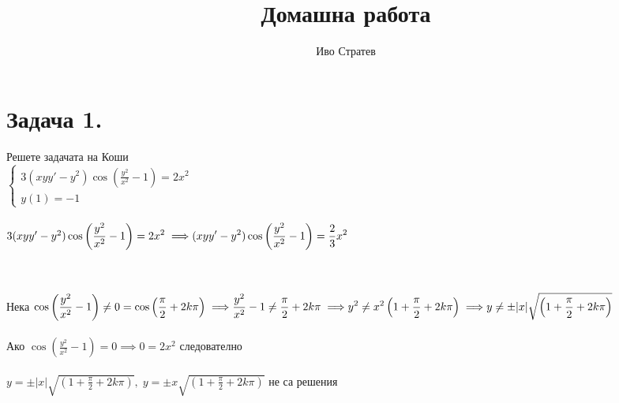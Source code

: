 \documentclass[12pt]{article}
\title{Домашна работа}
\author{Иво Стратев}
\begin{document}
\maketitle

\section*{Задача 1.}
Решете задачата на Коши \\

$\begin{cases}
    3(xyy' - y^2)\displaystyle\cos\left(\frac{y^2}{x^2} - 1\right) = 2x^2 \\
    y(1) = -1
\end{cases}$ \\\\

$
3(xyy' - y^2)\displaystyle\cos\left(\frac{y^2}{x^2} - 1\right) = 2x^2 \implies \\\\\\
(xyy' - y^2)\displaystyle\cos\left(\frac{y^2}{x^2} - 1\right) = \frac{2}{3}x^2
$ \\\\\

Нека $
\displaystyle\cos\left(\frac{y^2}{x^2} - 1\right) \neq 0 = \displaystyle\cos\left(\frac{\pi}{2} + 2k\pi\right) \implies \\\\\\
\frac{y^2}{x^2} - 1 \neq \frac{\pi}{2} + 2k\pi \implies \\\\\\
y^2 \neq x^2\left(1 + \frac{\pi}{2} + 2k\pi\right) \implies \\\\\\
y \neq \pm |x|\displaystyle\sqrt{\left(1 + \frac{\pi}{2} + 2k\pi\right)}
$ \\\\

Ако $\displaystyle\cos\left(\frac{y^2}{x^2} - 1\right) = 0 \implies 0 = 2x^2 $ следователно \\\\

$y = \pm |x|\displaystyle\sqrt{\left(1 + \frac{\pi}{2} + 2k\pi\right)}, \; y = \pm x\displaystyle\sqrt{\left(1 + \frac{\pi}{2} + 2k\pi\right)} $ не са решения \\\\
\end{document}
